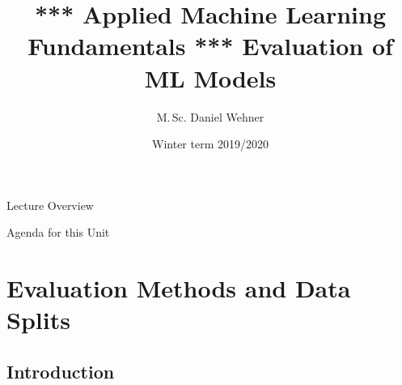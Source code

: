


\title[Evaluation of ML Models]{*** Applied Machine Learning Fundamentals *** Evaluation of ML Models}
\author{M.\,Sc. Daniel Wehner}
\date{Winter term 2019/2020}




\maketitlepage


\begin{frame}{Lecture Overview}{}
\end{frame}


\begin{frame}{Agenda for this Unit}
	\begin{multicols}{2}
		\tableofcontents
	\end{multicols}
\end{frame}


\section{Evaluation Methods and Data Splits}

\subsection{Introduction}

